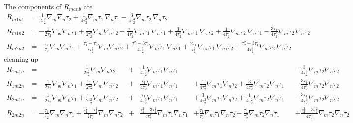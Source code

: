 The components of $R_{manb}$ are
\begin{equation}
\begin{aligned}
R_{m1n1} &= \frac{1}{2\tau_2^2}\nabla_m\nabla_n\tau_2 + \frac{1}{4\tau_2^3}\nabla_m\tau_1\,\nabla_n\tau_1 - \frac{3}{4\tau_2^3}\nabla_m\tau_2\,\nabla_n\tau_2\\
R_{m1n2} &= -\frac{1}{2\tau_2}\nabla_m\nabla_n\tau_1 + \frac{\tau_1}{2\tau_2^2}\nabla_m\nabla_n\tau_2 + \frac{\tau_1}{4\tau_2^3}\nabla_m\tau_1\,\nabla_n\tau_1 + \frac{3}{4\tau_2^2}\nabla_m\tau_1\,\nabla_n\tau_2 + \frac{1}{4\tau_2^2}\nabla_m\tau_2\,\nabla_n\tau_1 - \frac{3\tau_1}{4\tau_2^3}\nabla_m\tau_2\,\nabla_n\tau_2\\
R_{m2n2} &= -\frac{\tau_1}{\tau_2}\nabla_m\nabla_n\tau_1 + \frac{\tau_1^2-\tau_2^2}{2\tau_2^2}\nabla_m\nabla_n\tau_2 + \frac{\tau_1^2-3\tau_2^2}{4\tau_2^3}\nabla_m\tau_1\,\nabla_n\tau_1 + \frac{2\tau_1}{\tau_2^2}\nabla_{(m}\tau_1\,\nabla_{n)}\tau_2 + \frac{\tau_2^2-3\tau_1^2}{4\tau_2^3}\nabla_m\tau_2\,\nabla_n\tau_2
\end{aligned}
\end{equation}
cleaning up
\begin{align}
R_{1m1n} &= \phantom{-\frac{\tau_1}{\tau_2}\nabla_m\nabla_n\tau_1 +{}} \frac{1}{2\tau_2^2}\nabla_m\nabla_n\tau_2 &+& \frac{1}{4\tau_2^3}\nabla_m\tau_1\nabla_n\tau_1 &&& -\frac{3}{4\tau_2^3}\nabla_m\tau_2\nabla_n\tau_2 \\[6pt]
R_{1m2n} &= -\frac{1}{2\tau_2}\nabla_m\nabla_n\tau_1 + \frac{\tau_1}{2\tau_2^2}\nabla_m\nabla_n\tau_2 &+& \frac{\tau_1}{4\tau_2^3}\nabla_m\tau_1\nabla_n\tau_1 &+\frac{1}{4\tau_2^2}\nabla_m\tau_1\nabla_n\tau_2 +\frac{3}{4\tau_2^2}\nabla_m\tau_2\nabla_n\tau_1& &-\frac{3\tau_1}{4\tau_2^3}\nabla_m\tau_2\nabla_n\tau_2 \\[6pt]
R_{2m1n} &= -\frac{1}{2\tau_2}\nabla_m\nabla_n\tau_1 + \frac{\tau_1}{2\tau_2^2}\nabla_m\nabla_n\tau_2 &+& \frac{\tau_1}{4\tau_2^3}\nabla_m\tau_1\nabla_n\tau_1 &+\frac{3}{4\tau_2^2}\nabla_m\tau_1\nabla_n\tau_2 +\frac{1}{4\tau_2^2}\nabla_m\tau_2\nabla_n\tau_1& &-\frac{3\tau_1}{4\tau_2^3}\nabla_m\tau_2\nabla_n\tau_2 \\[6pt]
R_{2m2n} &= -\frac{\tau_1}{\tau_2}\nabla_m\nabla_n\tau_1 + \frac{\tau_1^2-\tau_2^2}{2\tau_2^2}\nabla_m\nabla_n\tau_2 &+& \frac{\tau_1^2-3\tau_2^2}{4\tau_2^3}\nabla_m\tau_1\nabla_n\tau_1 &+\frac{\tau_1}{\tau_2^2}\nabla_m\tau_1\nabla_n\tau_2 +\frac{\tau_1}{\tau_2^2}\nabla_m\tau_2\nabla_n\tau_1& &+\frac{\tau_2^2-3\tau_1^2}{4\tau_2^3}\nabla_m\tau_2\nabla_n\tau_2
\end{align}

